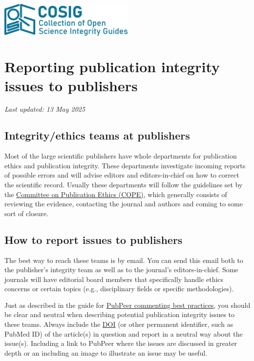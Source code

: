\documentclass[letterpaper, 12pt]{article}
\begin{document}
\flushleft
\includegraphics[width=0.5\textwidth]{img/home/241017_final_logo_mockup.png}

\section*{Reporting publication integrity issues to publishers}
\textit{Last updated: 13 May 2025}

\subsection*{Integrity/ethics teams at publishers}

Most of the large scientific publishers have whole departments for publication ethics and publication integrity. These departments investigate incoming reports of possible errors and will advise editors and editors-in-chief on how to correct the scientific record. Usually these departments will follow the guidelines set by the \href{https://publicationethics.org/}{Committee on Publication Ethics (COPE)}, which generally consists of reviewing the evidence, contacting the journal and authors and coming to some sort of closure.

\subsection*{How to report issues to publishers}

The best way to reach these teams is by email. You can send this email both to the publisher's integrity team as well as to the journal's editors-in-chief. Some journals will have editorial board members that specifically handle ethics concerns or certain topics (e.g., disciplinary fields or specific methodologies).

Just as described in the guide for \href{https://osf.io/sghaq}{PubPeer commenting best practices}, you should be clear and neutral when describing potential publication integrity issues to these teams. Always include the \href{https://www.doi.org/}{DOI} (or other permanent identifier, such as PubMed ID) of the article(s) in question and report in a neutral way about the issue(s). Including a link to PubPeer where the issues are discussed in greater depth or an including an image to illustrate an issue may be useful.
\end{document}
